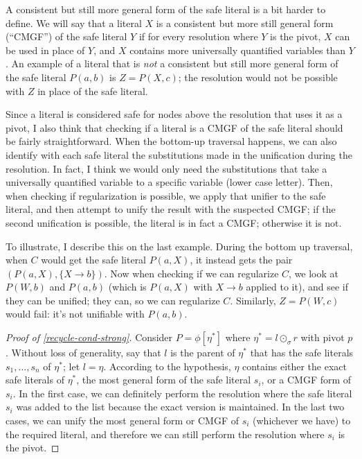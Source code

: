 \documentclass[12pt]{article}
\theoremstyle{definition}
\theoremstyle{remark}
\begin{document}
A consistent but still more general form of the safe literal is a bit harder to define. We will say that a literal $X$ is a consistent but more still general form (``CMGF'') of the safe literal $Y$ if for every resolution where $Y$ is the pivot, $X$ can be used in place of $Y$, and $X$ contains more universally quantified variables than $Y$. An example of a literal that is \emph{not} a consistent but still more general form of the safe literal $P(a,b)$ is $Z=P(X,c)$; the resolution would not be possible with $Z$ in place of the safe literal.

Since a literal is considered safe for nodes above the resolution that uses it as a pivot, I also think that checking if a literal is a CMGF of the safe literal should be fairly straightforward. When the bottom-up traversal happens, we can also identify with each safe literal the substitutions made in the unification during the resolution. In fact, I think we would only need the substitutions that take a universally quantified variable to a specific variable (lower case letter). Then, when checking if regularization is possible, we apply that unifier to the safe literal, and then attempt to unify the result with the suspected CMGF; if the second unification is possible, the literal is in fact a CMGF; otherwise it is not. 

To illustrate, I describe this on the last example. During the bottom up traversal, when $C$ would get the safe literal $P(a,X)$, it instead gets the pair $(P(a,X),\{X \rightarrow b\})$. Now when checking if we can regularize $C$, we look at $P(W,b)$ and $P(a,b)$ (which is $P(a,X)$ with $X \rightarrow b$ applied to it), and see if they can be unified; they can, so we can regularize $C$. Similarly, $Z=P(W,c)$ would fail: it's not unifiable with $P(a,b)$.




\begin{proof}[Proof of \ref{recycle-cond-strong}]
Consider $P=\phi[\eta^*]$ where $\eta^* = l \odot_\sigma r$ with pivot $p$. Without loss of generality, say that $l$ is the parent of $\eta^*$ that has the safe literals $s_1,\ldots,s_n$ of $\eta^*$; let $l = \eta$. According to the hypothesis, $\eta$ contains either the exact safe literals of $\eta^*$, the most general form of the safe literal $s_i$, or a CMGF form of $s_i$. In the first case, we can definitely perform the resolution where the safe literal $s_i$ was added to the list because the exact version is maintained. In the last two cases, we can unify the most general form or CMGF of $s_i$ (whichever we have) to the required literal, and therefore we can still perform the resolution where $s_i$ is the pivot.
\end{proof}
\end{document}
